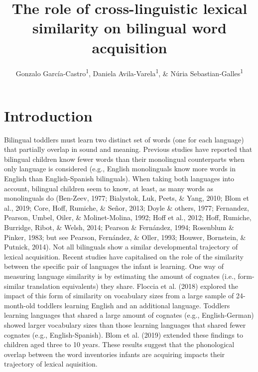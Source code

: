 \documentclass[english,man,man,floatsintext]{apa6}
\author{Gonzalo García-Castro\textsuperscript{1}, Daniela Avila-Varela\textsuperscript{1}, \& Núria Sebastian-Galles\textsuperscript{1}}
\affiliation{
\vspace{0.5cm}
\textsuperscript{1} Center for Brain and Cognition, Universitat Pompeu Fabra}
\title{The role of cross-linguistic lexical similarity on bilingual word acquisition}
\date{}
\begin{document}
\maketitle

\hypertarget{introduction}{%
\section{Introduction}\label{introduction}}

Bilingual toddlers must learn two distinct set of words (one for each language) that partially overlap in sound and meaning. Previous studies have reported that bilingual children know fewer words than their monolingual counterparts when only language is considered (e.g., English monolinguals know more words in English than English-Spanish bilinguals). When taking both languages into account, bilingual children seem to know, at least, as many words as monolinguals do (Ben-Zeev, 1977; Bialystok, Luk, Peets, \& Yang, 2010; Blom et al., 2019; Core, Hoff, Rumiche, \& Señor, 2013; Doyle \& others, 1977; Fernandez, Pearson, Umbel, Oiler, \& Molinet-Molina, 1992; Hoff et al., 2012; Hoff, Rumiche, Burridge, Ribot, \& Welsh, 2014; Pearson \& Fernández, 1994; Rosenblum \& Pinker, 1983; but see Pearson, Fernández, \& Oller, 1993; Houwer, Bornstein, \& Putnick, 2014). Not all bilinguals show a similar developmental trajectory of lexical acquisition. Recent studies have capitalised on the role of the similarity between the specific pair of languages the infant is learning. One way of measuring language similarity is by estimating the amount of cognates (i.e., form-similar translation equivalents) they share. Floccia et al. (2018) explored the impact of this form of similarity on vocabulary sizes from a large sample of 24-month-old toddlers learning English and an additional language. Toddlers learning languages that shared a large amount of cognates (e.g., English-German) showed larger vocabulary sizes than those learning languages that shared fewer cognates (e.g., English-Spanish). Blom et al. (2019) extended these findings to children aged three to 10 years. These results suggest that the phonological overlap between the word inventories infants are acquiring impacts their trajectory of lexical aquisition.
\end{document}
